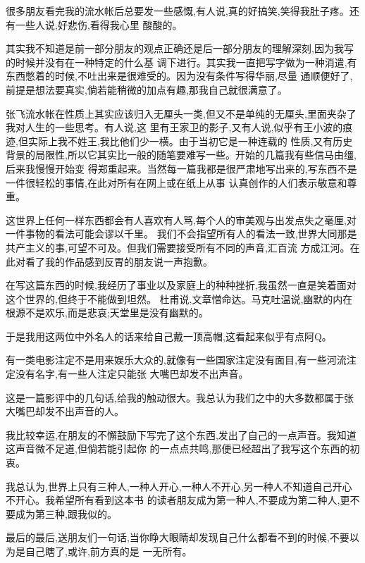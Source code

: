 ﻿\documentclass[12pt,twocolumn]{article}
\begin{document}
{\sf \small

很多朋友看完我的流水帐后总要发一些感慨,有人说,真的好搞笑,笑得我肚子疼。还有一些人说,好悲伤,看得我心里
酸酸的。

其实我不知道是前一部分朋友的观点正确还是后一部分朋友的理解深刻,因为我写的时候并没有在一种特定的什么基
调下进行。其实我一直把写字做为一种消遣,有东西憋着的时候,不吐出来是很难受的。因为没有条件写得华丽,尽量
通顺便好了,前提是想法要真实,倘若能稍微的加点有趣,那我自己就很满意了。

张飞流水帐在性质上其实应该归入无厘头一类,但又不是单纯的无厘头,里面夹杂了我对人生的一些思考。有人说,这
里有王家卫的影子,又有人说,似乎有王小波的痕迹,但实际上我不姓王,我比他们少一横。由于当初它是一种连载的
性质,又有历史背景的局限性,所以它其实比一般的随笔要难写一些。开始的几篇我有些信马由缰,后来我慢慢开始变
得郑重起来。当然每一篇我都是很严肃地写出来的,写东西不是一件很轻松的事情,在此对所有在网上或在纸上从事
认真创作的人们表示敬意和尊重。

这世界上任何一样东西都会有人喜欢有人骂,每个人的审美观与出发点失之毫厘,对一件事物的看法可能会谬以千里。
我们不会指望所有人的看法一致,世界大同那是共产主义的事,可望不可及。但我们需要接受所有不同的声音,汇百流
方成江河。在此对看了我的作品感到反胃的朋友说一声抱歉。

在写这篇东西的时候,我经历了事业以及家庭上的种种挫折,我虽然一直是笑着面对这个世界的,但终于不能做到坦然。
杜甫说,文章憎命达。马克吐温说,幽默的内在根源不是欢乐,而是悲哀;天堂里是没有幽默的。

于是我用这两位中外名人的话来给自己戴一顶高帽,这看起来似乎有点阿Q。

有一类电影注定不是用来娱乐大众的,就像有一些国家注定没有面目,有一些河流注定没有名字,有一些人注定只能张
大嘴巴却发不出声音。

这是一篇影评中的几句话,给我的触动很大。我总认为我们之中的大多数都属于张大嘴巴却发不出声音的人。

我比较幸运,在朋友的不懈鼓励下写完了这个东西,发出了自己的一点声音。我知道这声音微不足道,但倘若能引起你
的一点点共鸣,那便已经超出了我写这个东西的初衷。

我总认为,世界上只有三种人,一种人开心,一种人不开心,另一种人不知道自己开心不开心。我希望所有看到这本书
的读者朋友成为第一种人,不要成为第二种人,更不要成为第三种,跟我似的。

最后的最后,送朋友们一句话,当你睁大眼睛却发现自己什么都看不到的时候,不要以为是自己瞎了,或许,前方真的是
一无所有。
}
\end{document}
